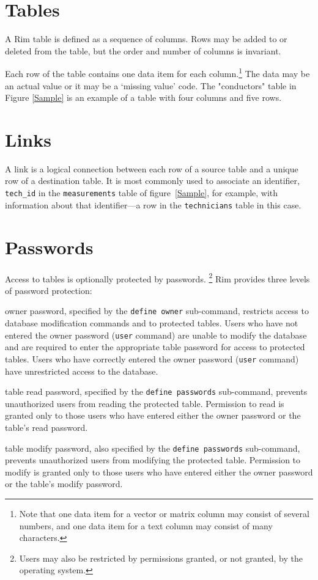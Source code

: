 \documentclass[11pt,a4paper]{report}
\begin{document}
\section{Tables}
A Rim table is defined as a sequence of columns.
Rows may be added to or deleted from the table, but the
order and number of columns is invariant.
 
Each row of the table contains one data item for each
column.\footnote{Note that one data item for a vector or
matrix column may consist of several numbers, and one data item
for a text column may consist of many characters.}
The data may be an actual value or it may be a `missing value' code.
The "conductors" table in Figure \ref{Sample} is an example
of a table with four columns and five rows.
 
 
 
\section{Links}
A link is a logical connection between
each row of a source table and a unique
row of a destination table.
It is most commonly used to associate an identifier,
\verb!tech_id! in the \verb!measurements! table of
figure~\ref{Sample}, for example,
with information about that identifier---a row in the
\verb!technicians! table in this case.
 
\section{Passwords}
Access to tables is optionally protected by passwords.%
\footnote{Users may also be restricted by permissions granted,
or not granted,
by the operating system.}
Rim provides three levels of password protection:
 
\begin{List}
\item[owner password,] specified by the \verb!define owner! sub-command,
restricts access to database modification commands and to protected
tables.
Users who have not entered the owner password (\verb!user! command)
are unable to modify the database and are required to
enter the appropriate table password for access to
protected tables.
Users who have correctly entered the owner password (\verb!user! command)
have unrestricted access to the database.
\item[table read password,]
specified by the \verb!define passwords! sub-command,
prevents unauthorized users from reading the protected table.
Permission to read is granted only to those users who have entered
either the owner password or the table's read password.
\item[table modify password,] also
specified by the \verb!define passwords! sub-com\-mand,
prevents unauthorized users from modifying the protected table.
Permission to modify is granted only to those users who have entered
either the owner password or the table's modify password.
\end{List}
 
\end{document}
